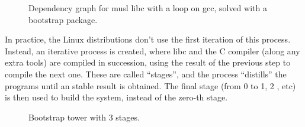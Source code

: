 \begin{figure}[hbt]
    \centerfloat
    
    \caption{Dependency graph for musl libc with a loop on gcc, solved with a bootstrap package.}
    \label{fig:libc-deps4}
\end{figure}

In practice, the Linux distributions don't use the first
iteration of this process. Instead, an iterative process is
created, where libc and the C compiler (along any extra
tools) are compiled in succession, using the result of the
previous step to compile the next one. These are called
``stages'', and the process ``distills'' the programs until
an stable result is obtained. The final stage (from 0 to 1,
2 , etc) is then used to build the system, instead of the
zero-th stage.

\begin{figure}[hbt]
    \centerfloat
    
    \caption{Bootstrap tower with 3 stages.}
    \label{fig:libc-deps5}
\end{figure}
